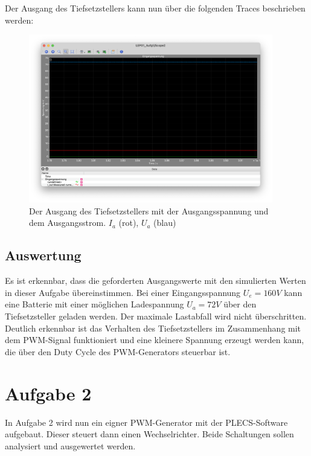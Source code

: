 \documentclass{report}
\begin{document}
Der Ausgang des Tiefsetzstellers kann nun über die folgenden Traces beschrieben werden:

\begin{figure}
  \begin{center}
    \includegraphics[width=0.95\textwidth]{assets/img/aufg1_ausgang.png}
  \end{center}
  \caption{Der Ausgang des Tiefsetzstellers mit der Ausgangsspannung und dem Ausgangsstrom. $I_a$ (rot), $U_a$ (blau)}
  \label{fig:aufg1_ausgang}
\end{figure}

\subsection{Auswertung}

Es ist erkennbar, dass die geforderten Ausgangswerte mit den simulierten Werten in dieser Aufgabe übereinstimmen. Bei einer Eingangsspannung $U_e = 160V$ kann eine Batterie mit einer möglichen Ladespannung $U_a = 72V$ über den Tiefsetzsteller geladen werden. Der maximale Lastabfall wird nicht überschritten. Deutlich erkennbar ist das Verhalten des Tiefsetzstellers im Zusammenhang mit dem PWM-Signal funktioniert und eine kleinere Spannung erzeugt werden kann, die über den Duty Cycle des PWM-Generators steuerbar ist. 

\section{Aufgabe 2}

In Aufgabe 2 wird nun ein eigner PWM-Generator mit der PLECS-Software aufgebaut. Dieser steuert dann einen Wechselrichter. Beide Schaltungen sollen analysiert und ausgewertet werden.
\end{document}
